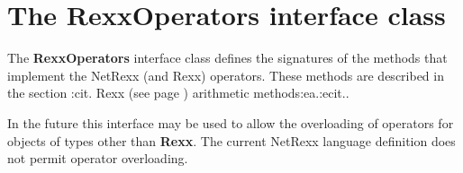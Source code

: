 \chapter{The RexxOperators interface class}\label{"id"}
 
The \textbf{RexxOperators} interface class defines the signatures of
the methods that implement the NetRexx (and Rexx) operators.  These
methods are described in the section :cit. Rexx (see page \pageref{refrexxops}) 
arithmetic methods:ea.:ecit..
 
In the future this interface may be used to allow the overloading of
operators for objects of types other than \textbf{Rexx}.  The current
NetRexx language definition does not permit operator overloading.
